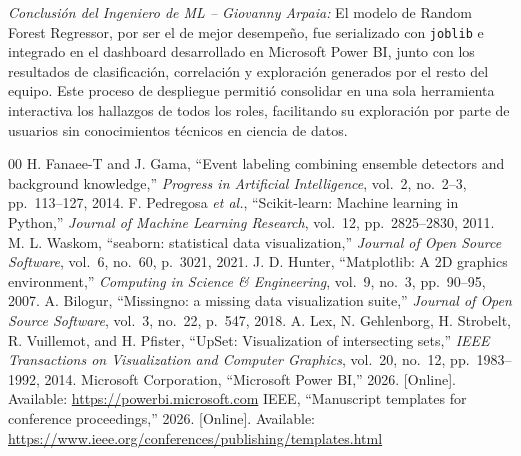 \documentclass[conference]{IEEEtran}
\begin{document}
\textit{Conclusión del Ingeniero de ML -- Giovanny Arpaia:} El modelo de Random Forest Regressor, por ser el de mejor desempeño, fue serializado con \texttt{joblib} e integrado en el dashboard desarrollado en Microsoft Power BI, junto con los resultados de clasificación, correlación y exploración generados por el resto del equipo. Este proceso de despliegue permitió consolidar en una sola herramienta interactiva los hallazgos de todos los roles, facilitando su exploración por parte de usuarios sin conocimientos técnicos en ciencia de datos.

\begin{thebibliography}{00}
 H. Fanaee-T and J. Gama, ``Event labeling combining ensemble detectors and background knowledge,'' \textit{Progress in Artificial Intelligence}, vol.~2, no.~2--3, pp.~113--127, 2014.
 F. Pedregosa \textit{et al.}, ``Scikit-learn: Machine learning in Python,'' \textit{Journal of Machine Learning Research}, vol.~12, pp.~2825--2830, 2011.
 M. L. Waskom, ``seaborn: statistical data visualization,'' \textit{Journal of Open Source Software}, vol.~6, no.~60, p.~3021, 2021.
 J. D. Hunter, ``Matplotlib: A 2D graphics environment,'' \textit{Computing in Science \& Engineering}, vol.~9, no.~3, pp.~90--95, 2007.
 A. Bilogur, ``Missingno: a missing data visualization suite,'' \textit{Journal of Open Source Software}, vol.~3, no.~22, p.~547, 2018.
 A. Lex, N. Gehlenborg, H. Strobelt, R. Vuillemot, and H. Pfister, ``UpSet: Visualization of intersecting sets,'' \textit{IEEE Transactions on Visualization and Computer Graphics}, vol.~20, no.~12, pp.~1983--1992, 2014.
 Microsoft Corporation, ``Microsoft Power BI,'' 2026. [Online]. Available: \url{https://powerbi.microsoft.com}
 IEEE, ``Manuscript templates for conference proceedings,'' 2026. [Online]. Available: \url{https://www.ieee.org/conferences/publishing/templates.html}
\end{thebibliography}
\end{document}
